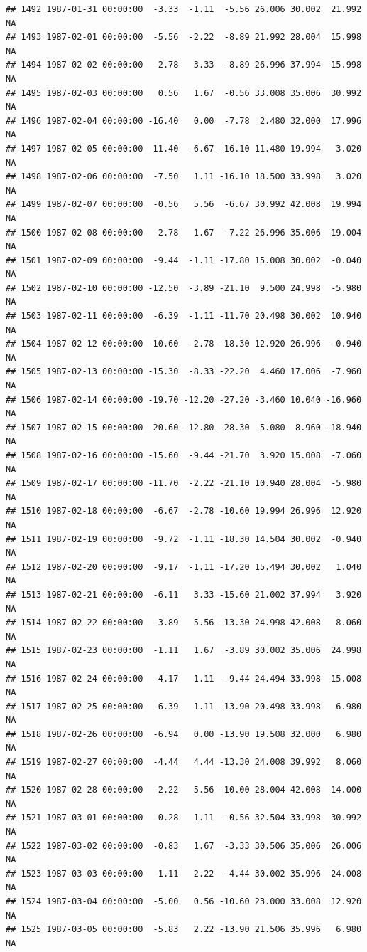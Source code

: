 \documentclass{article}\usepackage{graphicx, color}
\makeatletter
\newenvironment{kframe}{%
 \def\at@end@of@kframe{}%
 \ifinner\ifhmode%
  \def\at@end@of@kframe{\end{minipage}}%
  \begin{minipage}{\columnwidth}%
 \fi\fi%
 \def\FrameCommand##1{\hskip\@totalleftmargin \hskip-\fboxsep
 \colorbox{shadecolor}{##1}\hskip-\fboxsep
     \hskip-\linewidth \hskip-\@totalleftmargin \hskip\columnwidth}%
 \MakeFramed {\advance\hsize-\width
   \@totalleftmargin\z@ \linewidth\hsize
   \@setminipage}}%
 {\par\unskip\endMakeFramed%
 \at@end@of@kframe}
\newenvironment{knitrout}{}{} %
\makeatother
\begin{document}
\begin{knitrout}
\begin{kframe}
\begin{verbatim}
## 1492 1987-01-31 00:00:00  -3.33  -1.11  -5.56 26.006 30.002  21.992     NA
## 1493 1987-02-01 00:00:00  -5.56  -2.22  -8.89 21.992 28.004  15.998     NA
## 1494 1987-02-02 00:00:00  -2.78   3.33  -8.89 26.996 37.994  15.998     NA
## 1495 1987-02-03 00:00:00   0.56   1.67  -0.56 33.008 35.006  30.992     NA
## 1496 1987-02-04 00:00:00 -16.40   0.00  -7.78  2.480 32.000  17.996     NA
## 1497 1987-02-05 00:00:00 -11.40  -6.67 -16.10 11.480 19.994   3.020     NA
## 1498 1987-02-06 00:00:00  -7.50   1.11 -16.10 18.500 33.998   3.020     NA
## 1499 1987-02-07 00:00:00  -0.56   5.56  -6.67 30.992 42.008  19.994     NA
## 1500 1987-02-08 00:00:00  -2.78   1.67  -7.22 26.996 35.006  19.004     NA
## 1501 1987-02-09 00:00:00  -9.44  -1.11 -17.80 15.008 30.002  -0.040     NA
## 1502 1987-02-10 00:00:00 -12.50  -3.89 -21.10  9.500 24.998  -5.980     NA
## 1503 1987-02-11 00:00:00  -6.39  -1.11 -11.70 20.498 30.002  10.940     NA
## 1504 1987-02-12 00:00:00 -10.60  -2.78 -18.30 12.920 26.996  -0.940     NA
## 1505 1987-02-13 00:00:00 -15.30  -8.33 -22.20  4.460 17.006  -7.960     NA
## 1506 1987-02-14 00:00:00 -19.70 -12.20 -27.20 -3.460 10.040 -16.960     NA
## 1507 1987-02-15 00:00:00 -20.60 -12.80 -28.30 -5.080  8.960 -18.940     NA
## 1508 1987-02-16 00:00:00 -15.60  -9.44 -21.70  3.920 15.008  -7.060     NA
## 1509 1987-02-17 00:00:00 -11.70  -2.22 -21.10 10.940 28.004  -5.980     NA
## 1510 1987-02-18 00:00:00  -6.67  -2.78 -10.60 19.994 26.996  12.920     NA
## 1511 1987-02-19 00:00:00  -9.72  -1.11 -18.30 14.504 30.002  -0.940     NA
## 1512 1987-02-20 00:00:00  -9.17  -1.11 -17.20 15.494 30.002   1.040     NA
## 1513 1987-02-21 00:00:00  -6.11   3.33 -15.60 21.002 37.994   3.920     NA
## 1514 1987-02-22 00:00:00  -3.89   5.56 -13.30 24.998 42.008   8.060     NA
## 1515 1987-02-23 00:00:00  -1.11   1.67  -3.89 30.002 35.006  24.998     NA
## 1516 1987-02-24 00:00:00  -4.17   1.11  -9.44 24.494 33.998  15.008     NA
## 1517 1987-02-25 00:00:00  -6.39   1.11 -13.90 20.498 33.998   6.980     NA
## 1518 1987-02-26 00:00:00  -6.94   0.00 -13.90 19.508 32.000   6.980     NA
## 1519 1987-02-27 00:00:00  -4.44   4.44 -13.30 24.008 39.992   8.060     NA
## 1520 1987-02-28 00:00:00  -2.22   5.56 -10.00 28.004 42.008  14.000     NA
## 1521 1987-03-01 00:00:00   0.28   1.11  -0.56 32.504 33.998  30.992     NA
## 1522 1987-03-02 00:00:00  -0.83   1.67  -3.33 30.506 35.006  26.006     NA
## 1523 1987-03-03 00:00:00  -1.11   2.22  -4.44 30.002 35.996  24.008     NA
## 1524 1987-03-04 00:00:00  -5.00   0.56 -10.60 23.000 33.008  12.920     NA
## 1525 1987-03-05 00:00:00  -5.83   2.22 -13.90 21.506 35.996   6.980     NA

\end{verbatim}
\end{kframe}
\end{knitrout}
\end{document}
